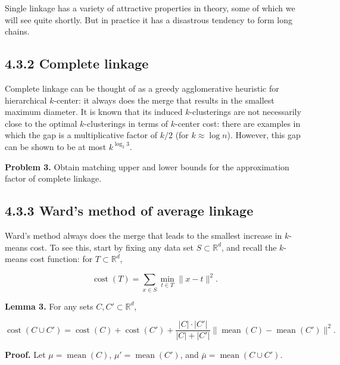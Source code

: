 \documentclass{article}
\begin{document}
Single linkage has a variety of attractive properties in theory, some of which we will see quite shortly. But in practice it has a disastrous tendency to form long chains.

\subsection*{4.3.2 Complete linkage}

Complete linkage can be thought of as a greedy agglomerative heuristic for hierarchical $k$-center: it always does the merge that results in the smallest maximum diameter. It is known that its induced $k$-clusterings are not necessarily close to the optimal $k$-clusterings in terms of $k$-center cost: there are examples in which the gap is a multiplicative factor of $k / 2$ (for $k \approx \log n$). However, this gap can be shown to be at most $k^{\log_{2} 3}$.

\textbf{Problem 3.} Obtain matching upper and lower bounds for the approximation factor of complete linkage.

\subsection*{4.3.3 Ward's method of average linkage}

Ward's method always does the merge that leads to the smallest increase in $k$-means cost. To see this, start by fixing any data set $S \subset \mathbb{R}^{d}$, and recall the $k$-means cost function: for $T \subset \mathbb{R}^{d}$,

\begin{equation*}
\operatorname{cost}(T) = \sum_{x \in S} \min_{t \in T} \|x - t\|^{2}.
\end{equation*}

\textbf{Lemma 3.} For any sets $C, C' \subset \mathbb{R}^{d}$,

\begin{equation*}
\operatorname{cost}(C \cup C') = \operatorname{cost}(C) + \operatorname{cost}(C') + \frac{|C| \cdot |C'|}{|C| + |C'|} \|\operatorname{mean}(C) - \operatorname{mean}(C')\|^{2}.
\end{equation*}

\textbf{Proof.} Let $\mu = \operatorname{mean}(C)$, $\mu' = \operatorname{mean}(C')$, and $\bar{\mu} = \operatorname{mean}(C \cup C')$.
\end{document}
